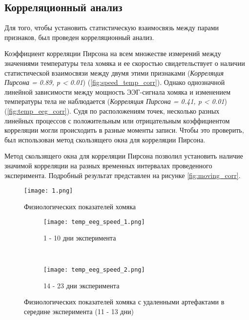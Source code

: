 \documentclass[12pt,a4paper,oneside]{article}
\begin{document}
\subsection{Корреляционный анализ}

Для того, чтобы установить статистическую взаимосвязь между парами признаков, был проведен корреляционный анализ. 

Коэффициент корреляции Пирсона на всем множестве измерений между значениями температуры тела хомяка и ее скоростью свидетельствует о наличии статистической взаимосвязи между двумя этими признаками (\textit{Корреляция Пирсона = 0.89, p < 0.01}) (\ref{fig:speed_temp_corr}). Однако однозначной линейной зависимости между мощность ЭЭГ-сигнала хомяка и изменением температуры тела не наблюдается (\textit{Корреляция Пирсона = 0.41, p < 0.01}) (\ref{fig:temp_eeg_corr}). Судя по расположениям точек, несколько разных линейных процессов с положительным или отрицательным коэффициентом корреляции могли происходить в разные моменты записи. Чтобы это проверить, был использован метод скользящего окна для корреляции Пирсона.

Метод скользящего окна для корреляции Пирсона позволил установить наличие значимой корреляции на разных временных интервалах проведенного эксперимента. Подробный результат представлен на рисунке \ref{fig:moving_corr}.

\begin{figure}
  \centering
  \texttt{[image: 1.png]}
  \caption{Физиологических показателей хомяка}
  \label{fig:1}
\end{figure}

\begin{figure}

	\centering
    \begin{subfigure}[a]{0.5\textwidth}
        \texttt{[image: temp\_eeg\_speed\_1.png]}
        \caption{1 - 10 дни эксперимента}
        \label{fig:temp_eeg_speed_1}
    \end{subfigure}
    ~
    \begin{subfigure}[b]{0.5\textwidth}
        \texttt{[image: temp\_eeg\_speed\_2.png]}
        \caption{14 - 23 дни эксперимента}
        \label{fig:temp_eeg_speed_2}
    \end{subfigure}

    \caption{Физиологических показателей хомяка с удаленными артефактами в середине эксперимента (11 - 13 дни)}\label{fig:temp_eeg_speed}
\end{figure}
\end{document}
